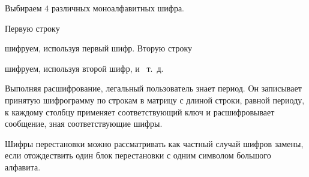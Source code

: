 Выбираем $4$ различных моноалфавитных шифра.

Первую строку

\begin{center}  \end{center}

шифруем, используя первый шифр. Вторую строку

\begin{center}  \end{center}

шифруем, используя второй шифр, и ~т.~д.

Выполняя расшифрование, легальный пользователь знает период. Он записывает принятую шифрограмму по строкам в матрицу с длиной строки, равной периоду, к каждому столбцу применяет соответствующий ключ и расшифровывает сообщение, зная соответствующие шифры.

Шифры перестановки можно рассматривать как частный случай шифров замены, если отождествить один блок перестановки с одним символом большого алфавита.
